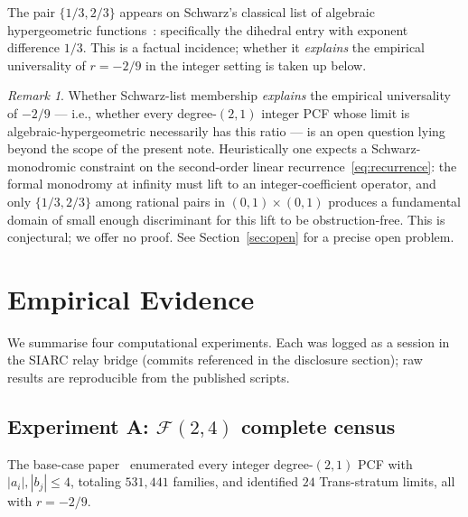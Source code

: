 \documentclass[11pt]{amsart}
\theoremstyle{definition}
\theoremstyle{remark}
\newtheorem{remark}[theorem]{Remark}
\newcommand{\FF}{\mathcal{F}}
\begin{document}
The pair $\{1/3, 2/3\}$ appears on Schwarz's classical list of
algebraic hypergeometric functions~\cite{Schwarz}: specifically the
dihedral entry with exponent difference $1/3$.  This is a factual
incidence; whether it \emph{explains} the empirical universality of
$r = -2/9$ in the integer setting is taken up below.

\begin{remark}\label{rem:schwarz-speculation}
Whether Schwarz-list membership \emph{explains} the empirical
universality of $-2/9$ --- i.e., whether every degree-$(2,1)$
integer PCF whose limit is algebraic-hypergeometric necessarily has
this ratio --- is an open question lying beyond the scope of the
present note.  Heuristically one expects a Schwarz-monodromic
constraint on the second-order linear recurrence~\eqref{eq:recurrence}:
the formal monodromy at infinity must lift to an integer-coefficient
operator, and only $\{1/3,2/3\}$ among rational pairs in $(0,1) \times
(0,1)$ produces a fundamental domain of small enough discriminant for
this lift to be obstruction-free.  This is conjectural; we offer no
proof.  See Section~\ref{sec:open} for a precise open problem.
\end{remark}

\section{Empirical Evidence}\label{sec:evidence}

We summarise four computational experiments.  Each was logged as a
session in the SIARC relay bridge (commits referenced in the
disclosure section); raw results are reproducible from the published
scripts.

\subsection*{Experiment A: $\FF(2,4)$ complete census}
The base-case paper~\cite{PCF25} enumerated every integer
degree-$(2,1)$ PCF with $|a_i|, |b_j| \le 4$, totaling $531{,}441$
families, and identified $24$ Trans-stratum limits, all with
$r = -2/9$.
\end{document}
